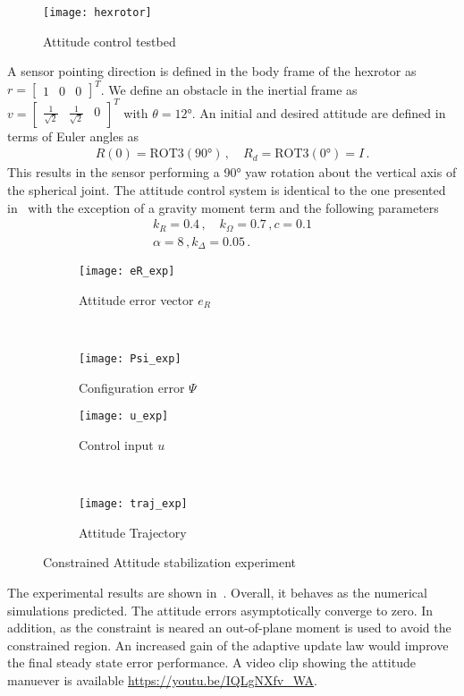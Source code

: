 \documentclass[letterpaper, 10 pt, conference]{ieeeconf}  %
\begin{document}
\begin{figure}
	\texttt{[image: hexrotor]}
	\caption{Attitude control testbed~\label{fig:hexrotor}}
\end{figure}
A sensor pointing direction is defined in the body frame of the hexrotor as \( r = \begin{bmatrix} 1 & 0 & 0 \end{bmatrix}^T \).
We define an obstacle in the inertial frame as \( v = \begin{bmatrix} \frac{1}{\sqrt{2}} & \frac{1}{\sqrt{2}} & 0\end{bmatrix}^T \) with \( \theta = \ang{12} \).
An initial and desired attitude are defined in terms of Euler angles as
\begin{gather}
	R(0) = \text{ROT3}(\ang{90}) \, , \quad R_d = \text{ROT3}(\ang{0})=I \, .
\end{gather}                                
This results in the sensor performing a \ang{90} yaw rotation about the vertical axis of the spherical joint.
The attitude control system is identical to the one presented in~ with the exception of a gravity moment term and the following parameters
\begin{gather*}
	k_R = 0.4 \, , \quad k_\Omega = 0.7 \, , c = 0.1 \\
	\alpha = 8 \, , k_\Delta = 0.05 \, .
\end{gather*}
\begin{figure} 
	\centering 
	\begin{subfigure}[htbp]{0.5\columnwidth} 
		\texttt{[image: eR\_exp]} 
		\caption{Attitude error vector \(e_R\) } \label{fig:eR_exp} 
	\end{subfigure}~ %
	\begin{subfigure}[htbp]{0.5\columnwidth} 
		\texttt{[image: Psi\_exp]} 
		\caption{Configuration error \( \Psi \)} \label{fig:Psi_exp} 
	\end{subfigure}
	
	\begin{subfigure}[htbp]{0.5\columnwidth} 
		\texttt{[image: u\_exp]} 
		\caption{Control input \( u\)} \label{fig:u_exp} 
	\end{subfigure}~
	\begin{subfigure}[htbp]{0.5\columnwidth} 
		\texttt{[image: traj\_exp]} 
		\caption{Attitude Trajectory} \label{fig:traj_exp} 
	\end{subfigure}
	\caption{Constrained Attitude stabilization experiment}
	\label{fig:exp} 
\end{figure}
The experimental results are shown in~.
Overall, it behaves as the numerical simulations predicted.
The attitude errors asymptotically converge to zero. 
In addition, as the constraint is neared an out-of-plane moment is used to avoid the constrained region.
An increased gain of the adaptive update law would improve the final steady state error performance.
A video clip showing the attitude manuever is available \url{https://youtu.be/IQLgNXfv_WA}.
\end{document}

